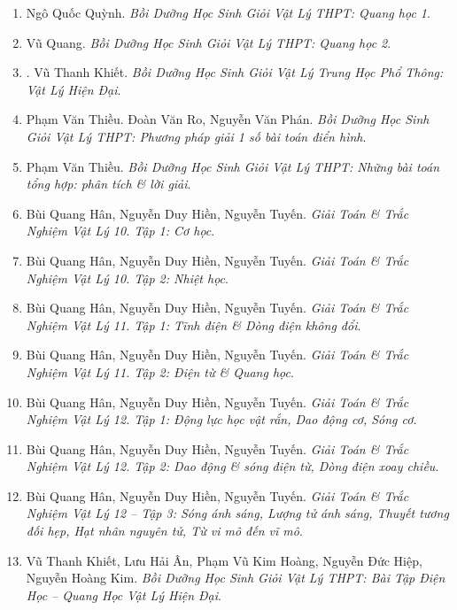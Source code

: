 \documentclass{article}
\begin{document}
\begin{enumerate}
	\item Ngô Quốc Quỳnh. {\it Bồi Dưỡng Học Sinh Giỏi Vật Lý THPT: Quang học 1}.\hfill{\sf[reading]}

	\item Vũ Quang. {\it Bồi Dưỡng Học Sinh Giỏi Vật Lý THPT: Quang học 2}.
	\item \cite{Khiet_Vat_Ly_hien_dai}. Vũ Thanh Khiết. {\it Bồi Dưỡng Học Sinh Giỏi Vật Lý Trung Học Phổ Thông: Vật Lý Hiện Đại}.\hfill{\sf[reading]}

	\item Phạm Văn Thiều. Đoàn Văn Ro, Nguyễn Văn Phán. {\it Bồi Dưỡng Học Sinh Giỏi Vật Lý THPT: Phương pháp giải 1 số bài toán điển hình}.

	\item Phạm Văn Thiều. {\it Bồi Dưỡng Học Sinh Giỏi Vật Lý THPT: Những bài toán tổng hợp: phân tích \& lời giải}.

	\item Bùi Quang Hân, Nguyễn Duy Hiền, Nguyễn Tuyến. {\it Giải Toán \& Trắc Nghiệm Vật Lý 10. Tập 1: Cơ học}.

	\item Bùi Quang Hân, Nguyễn Duy Hiền, Nguyễn Tuyến. {\it Giải Toán \& Trắc Nghiệm Vật Lý 10. Tập 2: Nhiệt học}.

	\item Bùi Quang Hân, Nguyễn Duy Hiền, Nguyễn Tuyến. {\it Giải Toán \& Trắc Nghiệm Vật Lý 11. Tập 1: Tĩnh điện \& Dòng điện không đổi}.

	\item Bùi Quang Hân, Nguyễn Duy Hiền, Nguyễn Tuyến. {\it Giải Toán \& Trắc Nghiệm Vật Lý 11. Tập 2: Điện từ \& Quang học}.

	\item Bùi Quang Hân, Nguyễn Duy Hiền, Nguyễn Tuyến. {\it Giải Toán \& Trắc Nghiệm Vật Lý 12. Tập 1: Động lực học vật rắn, Dao động cơ, Sóng cơ}.

	\item Bùi Quang Hân, Nguyễn Duy Hiền, Nguyễn Tuyến. {\it Giải Toán \& Trắc Nghiệm Vật Lý 12. Tập 2: Dao động \& sóng điện từ, Dòng điện xoay chiều}.

	\item Bùi Quang Hân, Nguyễn Duy Hiền, Nguyễn Tuyến. {\it Giải Toán \& Trắc Nghiệm Vật Lý 12 -- Tập 3: Sóng ánh sáng, Lượng tử ánh sáng, Thuyết tương đối hẹp, Hạt nhân nguyên tử, Từ vi mô đến vĩ mô}.

	\item Vũ Thanh Khiết, Lưu Hải Ân, Phạm Vũ Kim Hoàng, Nguyễn Đức Hiệp, Nguyễn Hoàng Kim. {\it Bồi Dưỡng Học Sinh Giỏi Vật Lý THPT: Bài Tập Điện Học -- Quang Học Vật Lý Hiện Đại}.
\end{enumerate}
\end{document}
